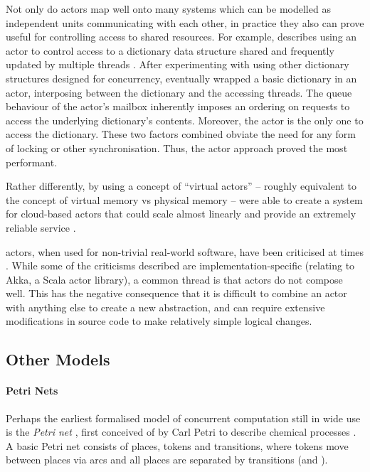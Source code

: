 Not only do \glspl{actor} map well onto many systems which can be modelled as independent units communicating with each other, in practice they also can prove useful for controlling access to shared resources.  For example, \citeauthor{Terrell2018} describes using an \gls{actor} to control access to a dictionary data structure shared and frequently updated by multiple threads \cite{Terrell2018}.  After experimenting with using other dictionary structures designed for concurrency, \citeauthor{Terrell2018} eventually wrapped a basic dictionary in an \gls{actor}, interposing between the dictionary and the accessing threads.  The queue behaviour of the \gls{actor}'s mailbox inherently imposes an ordering on requests to access the underlying dictionary's contents.   Moreover, the \gls{actor} is the only one to access the dictionary.  These two factors combined obviate the need for any form of locking or other synchronisation.  Thus, the \gls{actor} approach proved the most performant.

Rather differently, by using a concept of ``virtual actors'' -- roughly equivalent to the concept of virtual memory vs physical memory -- \citeauthor{Bernstein2016} were able to create a system for cloud-based actors that could scale almost linearly and provide an extremely reliable service \cite{Bernstein2016}.

\Glspl{actor}, when used for non-trivial real-world software, have been criticised at times \eg{} \cite{Welsh2013,Stucchio2013}.  While some of the criticisms described are implementation-specific (relating to Akka, a Scala \gls{actor} library), a common thread is that \glspl{actor} do not compose well.  This has the negative consequence that it is difficult to combine an \gls{actor} with anything else to create a new abstraction, and can require extensive modifications in source code to make relatively simple logical changes.

\subsection{\label{sec:back:othermodels}Other Models}

\paragraph{Petri Nets}
Perhaps the earliest formalised model of concurrent computation still in wide use is the \emph{Petri net} \cite{Dennis2011}, first conceived of by Carl Petri to describe chemical processes \cite{Petri2008}.  A basic Petri net consists of places, tokens and transitions, where tokens move between places via arcs and all places are separated by transitions (and \viceversa).

